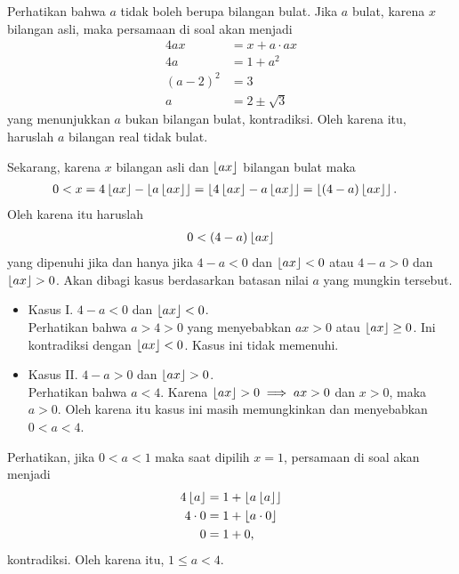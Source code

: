 
\begin{solusi}[1]
    Perhatikan bahwa $a$ tidak boleh berupa bilangan bulat. Jika $a$ bulat, karena $x$ bilangan asli, maka persamaan di soal akan menjadi
    \begin{align*}
        4ax &= x + a\cdot ax\\
        4a &= 1 + a^2\\
        (a-2)^2 &= 3\\
        a &= 2 \pm \sqrt{3} 
    \end{align*}
    yang menunjukkan $a$ bukan bilangan bulat, kontradiksi. Oleh karena itu, haruslah $a$ bilangan real tidak bulat.
    
    Sekarang, karena $x$ bilangan asli dan $\left\lfloor ax \right\rfloor$ bilangan bulat maka
    \begin{align*}
        0 < x &= 4\left\lfloor ax \right\rfloor - \left\lfloor a\left\lfloor ax \right\rfloor \right\rfloor = \left\lfloor 4\left\lfloor ax \right\rfloor - a\left\lfloor ax \right\rfloor \right\rfloor = \left\lfloor (4-a)\left\lfloor ax \right\rfloor \right\rfloor.
    \end{align*}
    Oleh karena itu haruslah
    \begin{align*}
        0 < (4-a)\left\lfloor ax \right\rfloor
    \end{align*}
    yang dipenuhi jika dan hanya jika $4-a < 0$ dan $\left\lfloor ax \right\rfloor < 0$ atau $4-a > 0$ dan $\left\lfloor ax \right\rfloor > 0$. Akan dibagi kasus berdasarkan batasan nilai $a$ yang mungkin tersebut.
    \begin{itemize}
        \item Kasus I. $4-a < 0$ dan $\left\lfloor ax \right\rfloor < 0$.\\
        Perhatikan bahwa $a > 4 > 0$ yang menyebabkan $ax > 0$ atau $\left\lfloor ax \right\rfloor \ge 0$. Ini kontradiksi dengan $\left\lfloor ax \right\rfloor < 0$. Kasus ini tidak memenuhi.
        \item Kasus II. $4-a > 0$ dan $\left\lfloor ax \right\rfloor > 0$.\\
        Perhatikan bahwa $a < 4$. Karena $\left\lfloor ax \right\rfloor > 0 \implies ax > 0$ dan $x > 0$, maka $a > 0$. Oleh karena itu kasus ini masih memungkinkan dan menyebabkan $0 < a < 4$.
    \end{itemize}
    
    Perhatikan, jika $0 < a < 1$ maka saat dipilih $x=1$, persamaan di soal akan menjadi
    \begin{align*}
        4\left\lfloor a \right\rfloor &= 1 + \left\lfloor a\left\lfloor a \right\rfloor \right\rfloor\\
        4 \cdot 0 &= 1 + \left\lfloor a \cdot 0 \right\rfloor\\
        0 &= 1 + 0,
    \end{align*}
    kontradiksi. Oleh karena itu, $1 \le a < 4$.
    

\end{solusi}

